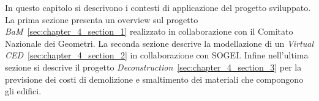 In questo capitolo si descrivono i contesti di applicazione del progetto sviluppato.
La prima sezione presenta un overview sul progetto \emph{BaM}~\ref{sec:chapter_4_section_1} realizzato
in collaborazione con il Comitato Nazionale dei Geometri.
La seconda sezione descrive la modellazione di un \emph{Virtual CED}~\ref{sec:chapter_4_section_2} in collaborazione con SOGEI.
Infine nell'ultima sezione si descrive il progetto \emph{Deconstruction}~\ref{sec:chapter_4_section_3} per la previsione dei
costi di demolizione e smaltimento dei materiali che compongono gli edifici.
